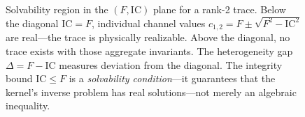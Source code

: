 \documentclass[
  aps,
  prd,
  twocolumn,
  superscriptaddress,
  nofootinbib,
  floatfix
]{revtex4-2}
\newcommand{\IC}{\mathrm{IC}}
\begin{document}
\begin{figure}[t!]
\caption{Solvability region in the $(F, \IC)$
plane for a rank-2 trace.  Below the
diagonal $\IC = F$, individual channel values
$c_{1,2} = F \pm \sqrt{F^2 - \IC^2}$ are real---the trace
is physically realizable.  Above the diagonal, no trace
exists with those aggregate invariants.  The heterogeneity
gap $\Delta = F - \IC$ measures deviation from the diagonal.
The integrity bound $\IC \leq F$ is a \emph{solvability
condition}---it guarantees that the kernel's inverse problem
has real solutions---not merely an algebraic inequality.}
\label{fig:solvability}
\end{figure}
\end{document}
